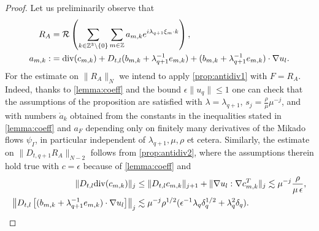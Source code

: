 \documentclass[10pt,a4paper]{amsart}
\numberwithin{equation}{section}
\numberwithin{corollario}{section}
\numberwithin{lemma}{section}
\numberwithin{prop}{section}
\theoremstyle{definition}
\theoremstyle{remark}
\newcommand{\Z}{\mathbb{Z}}
\newcommand{\dvg}{\mathord{{\rm div}}}
\newcommand{\qq}{_{q+1}}
\begin{document}
\begin{proof}
Let us preliminarily observe that 
\begin{align}
   R_A &= \mathcal{R}\left( \sum_{k \in \Z^3 \setminus \{0\}} \sum_{m \in \Z} a_{m,k} e^{i\lambda\qq \xi_m \cdot k}\right),
   \\
   a_{m,k}: &= \dvg(c_{m,k})+D_{t,l}(b_{m,k}+\lambda\qq^{-1}e_{m,k})+(b_{m,k}+\lambda\qq^{-1}e_{m,k})\cdot\nabla u_l.
\end{align}   
For the estimate on $\|R_A \|_N$ we intend to apply \autoref{prop:antidiv1} with $F=R_A$. Indeed, thanks to \autoref{lemma:coeff} and the bound $\epsilon\|u_q\|\leq1$ one can check that the assumptions of the proposition are satisfied with $\lambda=\lambda\qq$, $s_j = \frac{\rho}{\mu} \mu^{-j}$, and with numbers $\mathring{a}_k$ obtained from the constants in the inequalities stated in \autoref{lemma:coeff} and $a_F$ depending only on finitely many derivatives of the  Mikado flows $\psi_I$, in particular independent of $\lambda\qq,\mu,\rho$ et cetera.
Similarly, the estimate on $\|D_{t,q+1}R_A \|_{N-2}$ follows from \autoref{prop:antidiv2}, where the assumptions therein hold true with $c=\epsilon$ because of \autoref{lemma:coeff} and 
    \begin{align}\label{est:DtlRA}
        \|D_{t,l}\dvg(c_{m,k})\|_j &\le \|D_{t,l}c_{m,k}\|_{j+1}+\|\nabla u_l:\nabla c_{m,k}^T\|_j\lesssim \mu^{-j}\frac{\rho}{\mu\,\epsilon},
        \\
        \left\|D_{t,l}\left[(b_{m,k}+\lambda\qq^{-1}e_{m,k})\cdot\nabla u_l\right]\right\|_j 
        &\lesssim
        \mu^{-j}\rho^{1/2}(\epsilon^{-1}\lambda_q\delta_q^{1/2}+\lambda_q^2\delta_q).
    \end{align}
\end{proof}
\end{document}
